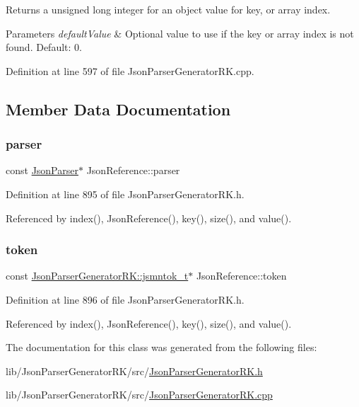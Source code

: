 Returns a unsigned long integer for an object value for key, or array index. 


\begin{DoxyParams}{Parameters}
{\em default\+Value} & Optional value to use if the key or array index is not found. Default\+: 0. \\
\hline
\end{DoxyParams}


Definition at line 597 of file Json\+Parser\+Generator\+R\+K.\+cpp.



\subsection{Member Data Documentation}
\mbox{\label{class_json_reference_a37fb436fae63e7e452fc2325eddf3e8b}} 
\subsubsection{\texorpdfstring{parser}{parser}}
{\footnotesize\ttfamily const \hyperlink{class_json_parser}{Json\+Parser}$\ast$ Json\+Reference\+::parser\hspace{0.3cm}{\ttfamily [private]}}



Definition at line 895 of file Json\+Parser\+Generator\+R\+K.\+h.



Referenced by index(), Json\+Reference(), key(), size(), and value().

\mbox{\label{class_json_reference_a895a16fb8f781504fe39efd194ed5232}} 
\subsubsection{\texorpdfstring{token}{token}}
{\footnotesize\ttfamily const \hyperlink{struct_json_parser_generator_r_k_1_1jsmntok__t}{Json\+Parser\+Generator\+R\+K\+::jsmntok\+\_\+t}$\ast$ Json\+Reference\+::token\hspace{0.3cm}{\ttfamily [private]}}



Definition at line 896 of file Json\+Parser\+Generator\+R\+K.\+h.



Referenced by index(), Json\+Reference(), key(), size(), and value().



The documentation for this class was generated from the following files\+:\begin{DoxyCompactItemize}
\item 
lib/\+Json\+Parser\+Generator\+R\+K/src/\hyperlink{_json_parser_generator_r_k_8h}{Json\+Parser\+Generator\+R\+K.\+h}\item 
lib/\+Json\+Parser\+Generator\+R\+K/src/\hyperlink{_json_parser_generator_r_k_8cpp}{Json\+Parser\+Generator\+R\+K.\+cpp}\end{DoxyCompactItemize}
